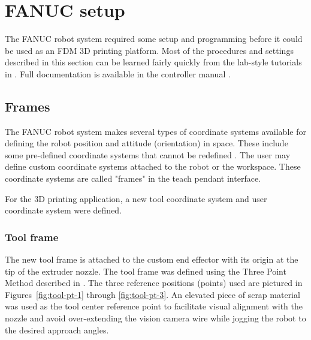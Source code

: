 \section{FANUC setup}
The FANUC robot system required some setup and programming before it could be used as an FDM 3D printing platform. Most of the procedures and settings described in this section can be learned fairly quickly from the lab-style tutorials in \cite{app-programming}. Full documentation is available in the controller manual \cite{lr-handling-tool}.

\subsection{Frames}
The FANUC robot system makes several types of coordinate systems available for defining the robot position and attitude (orientation) in space. These include some pre-defined coordinate systems  that cannot be redefined \cite[sec 3.9]{lr-handling-tool}. The user may define custom coordinate systems attached to the robot or the workspace. These coordinate systems are called "frames" in the teach pendant interface.

For the 3D printing application, a new tool coordinate system and user coordinate system were defined.

\subsubsection{Tool frame}
The new tool frame is attached to the custom end effector with its origin at the tip of the extruder nozzle. The tool frame was defined using the Three Point Method described in \cite[sec~3.9.1]{lr-handling-tool}. The three reference positions (points) used are pictured in Figures~\ref{fig:tool-pt-1} through \ref{fig:tool-pt-3}. An elevated piece of scrap material was used as the tool center reference point to facilitate visual alignment with the nozzle and avoid over-extending the vision camera wire while jogging the robot to the desired approach angles.

